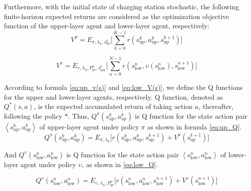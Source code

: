\documentclass[preprint,12pt]{elsarticle}
\begin{document}
Furthermore, with the initial state of charging station stochastic, the following finite-horizon expected returns are considered as the optimization objective function of the upper-layer agent and lower-layer
agent, respectively:
\begin{equation}
V^{\pi}=E_{\pi,\lambda_{k},s_{\textrm{up}}^{0}}\Biggl[\sum_{k=0}^{K-1}r(s_{\textrm{up}}^{k},a_{\textrm{up}}^{k},s_{\textrm{up}}^{k+1})\Biggr]\label{eq:up_agrnt_goal}
\end{equation}

\begin{equation}
V^{\upsilon}=E_{\upsilon,\lambda_{n},P_{ps}^{n},s_{\textrm{low}}^{0}}\Biggl[\sum_{n=0}^{N-1}r(s_{\textrm{low}}^{n},\upsilon(s_{\textrm{low}}^{n}),s_{\textrm{low}}^{n+1})\Biggr]\label{eq:low_agrnt_goal}
\end{equation}

According to formula \ref{eq:up_v(s)} and \ref{eq:low_V(s)}, we define the Q functions for the upper and lower-layer agents, respectively. Q function, denoted as $Q^{*}(s,a)$, is the expected accumulated
return of taking action $a$, thereafter, following the policy $*$. Thus, $Q^{\pi}(s_{up}^{k},a_{up}^{k})$ is Q function for the state
action pair $\left\langle s_{up}^{k},a_{up}^{k}\right\rangle $ of upper-layer agent under policy $\pi$ as shown in formula \ref{eq:up_Q}.
\begin{equation}
Q^{\pi}(s_{\textrm{up}}^{k},a_{\textrm{up}}^{k})=E_{\pi,\lambda_{k}}\Biggl[r(s_{\textrm{up}}^{k},a_{\textrm{up}}^{k},s_{\textrm{up}}^{k+1})+V^{\pi}(s_{\textrm{up}}^{k+1})\Biggr]\label{eq:up_Q}
\end{equation}

And $Q^{\upsilon}(s_{\textrm{low}}^{n},a_{\textrm{low}}^{n})$ is Q function for the state action pair $\left\langle s_{\textrm{low}}^{n},a_{\textrm{low}}^{n}\right\rangle $ of lower-layer agent under policy $\upsilon$, as shown in \ref{eq:low_Q}.

\begin{equation}
Q^{\upsilon}(s_{\textrm{low}}^{n},a_{\textrm{low}}^{n})=E_{\upsilon,\lambda_{n},P_{\textrm{ps}}^{n}}\Biggl[r(s_{\textrm{low}}^{n},a_{\textrm{low}}^{n},s_{\textrm{low}}^{n+1})
+V^{\upsilon}(s_{\textrm{low}}^{n+1})\Biggr]
\label{eq:low_Q}
\end{equation}
\end{document}
